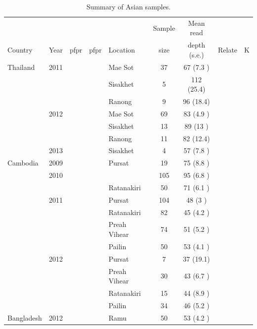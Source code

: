 \documentclass[9pt,lineno]{elife}
\begin{document}
\begin{table}[bt]
\caption{Summary of Asian samples.} \label{tab:Pf3kAsia}
\begin{tabular}{l c c c |l c c c c }
\toprule
        &          &&&         & Sample & Mean read             & & \\
Country &   Year   &pfpr&pfpr&Location & size   & depth (s.e.)  & Relate & K\\
\midrule
Thailand        &2011           &&&Mae Sot&37   &67   (7.3 )     &     &\\
                &               &&&Sisakhet&5    &112  (25.4)     &     &\\
                &               &&&Ranong&9    &96   (18.4)     &     &\\
                &2012           &&&Mae Sot&69   &83   (4.9 )     &     &\\
                &               &&&Sisakhet&13   &89   (13  )     &     &\\
                &               &&&Ranong&11   &82   (12.4)     &     &\\
                &2013           &&&Sisakhet&4    &57   (7.8 )     &     &\\
\hline
Cambodia        &2009           &&&Pursat&19   &75   (8.8 )     &     &\\
                &2010           &&&               &105  &95   (6.8 )     &     &\\
                &               &&&Ratanakiri&50   &71   (6.1 )     &     &\\
                &2011           &&&Pursat&104  &48   (3   )     &     &\\
                &               &&&Ratanakiri&82   &45   (4.2 )     &     &\\
                &               &&&Preah Vihear&74   &51   (5.2 )     &     &\\
                &               &&&Pailin&50   &53   (4.1 )     &     &\\
                &2012           &&&Pursat&7    &37   (19.1)     &     &\\
                &               &&&Preah Vihear&30   &43   (6.7 )     &     &\\
                &               &&&Ratanakiri&15   &44   (8.9 )     &     &\\
                &               &&&Pailin&34   &46   (5.2 )     &     &\\
\hline
Bangladesh      &2012           &&&Ramu &50   &53   (4.2 )     &     &\\

\end{tabular}
\end{table}
\end{document}
